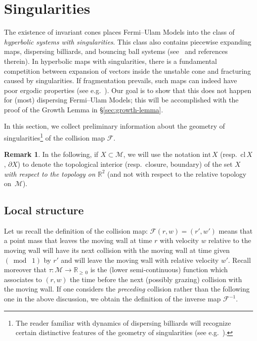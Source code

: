 \documentclass[10pt]{amsart}
\theoremstyle{definition}\newtheorem{defi}[theo]{Definition}\newtheorem{rema}[theo]{Remark}\newtheorem{exam}[theo]{Example}\newtheorem{exem}[theo]{Example}\newtheorem{nota}[theo]{Notation}
\newcommand{\ct}{r}
\newcommand{\fft}{\tau}
\newcommand{\intr}[1]{\mathrm{int}\,#1}
\newcommand{\inv}{^{-1}}
\newcommand{\reals}{\mathbb{R}}
\newcommand{\cm}{\mathcal{F}}
\newcommand{\csp}{\mathcal{M}}
\newcommand{\clo}{\text{cl}\,}
\begin{document}
\section{Singularities}\label{s_singularities}

The existence of invariant cones places Fermi--Ulam Models into the class of \emph{hyperbolic systems with singularities}. This class also contains piecewise expanding maps, dispersing billiards, and bouncing ball systems (see~\cite{ChM, LW, T2, W-particles} and references therein). In hyperbolic maps with singularities, there is a fundamental competition between expansion of vectors inside the unstable cone and fracturing caused by singularities. If fragmentation prevails, such maps can indeed have poor ergodic properties (see e.g.~\cite{T1}). Our goal is to show that this does not happen for (most) dispersing Fermi--Ulam Models; this will be accomplished with the proof of the Growth Lemma in \S\ref{sec:growth-lemma}.

In this section, we collect preliminary information about the geometry of singularities\footnote{The reader familiar with dynamics of dispersing billiards will recognize certain distinctive features of the geometry of singularities (see e.g.~\cite[\S2.10]{ChM}).} of the collision map $\cm$.

\begin{rema}
In the following, if $X\subset\csp$, we will use the notation $\intr X$ ({resp.\ $\clo X$, $\partial X$}) to denote the topological interior (resp.\ closure, boundary) of the set $X$
\emph{with respect to the topology on $\reals^2$} (and not with respect to the relative topology on~$\csp$).
\end{rema}

\subsection{Local structure}\label{ss_singularitiesLocalStructure}

Let us recall the definition of the collision map: $\cm(\ct,w) = (\ct',w')$ means that a point mass that leaves the moving wall at time $\ct$ with velocity $w$ relative to the moving wall will have its next collision with the moving wall at time given $(\bmod \; 1)$ by $\ct'$ and will leave the moving wall with relative velocity $w'$. Recall moreover that $\fft:\csp\to\reals_{\ge\,0}$ is the (lower semi-continuous) function which associates to $(\ct,w)$ the time before the next (possibly grazing) collision with the moving wall. If one considers the
\emph{preceding} collision rather than the following one in the above discussion, we obtain the definition of the inverse map $\cm\inv$.
\end{document}
